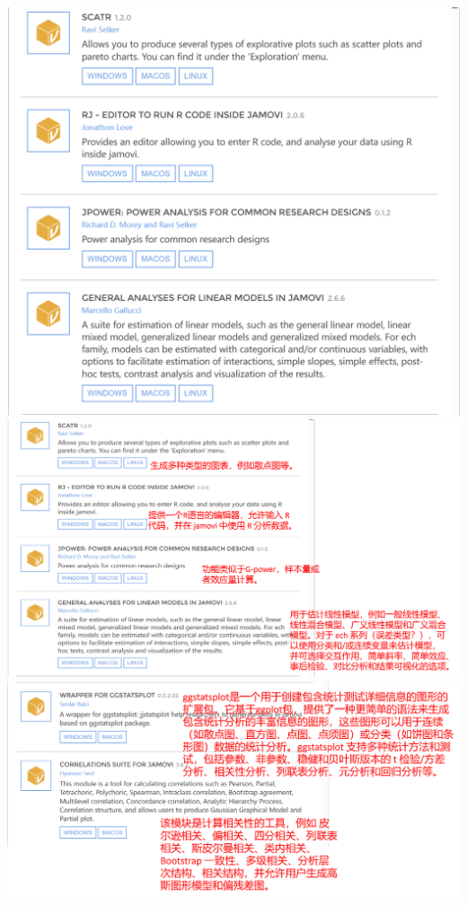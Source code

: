 \documentclass[]{ctexbook}
\theoremstyle{definition}
\theoremstyle{definition}
\theoremstyle{definition}
\theoremstyle{definition}
\theoremstyle{remark}
\begin{document}
\includegraphics{img/jamovi/modules1.png}\\
\includegraphics{img/jamovi/modules2.png}\\
\includegraphics{img/jamovi/modules3.png}\\
\end{document}
